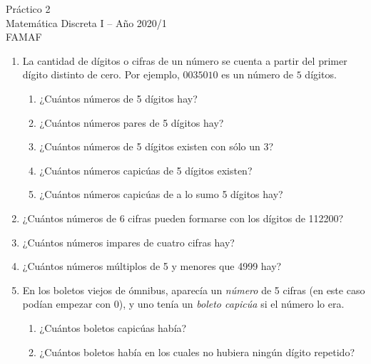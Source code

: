 \documentclass[12pt,spanish,makeidx]{amsbook}
\begin{document}
{\bf \begin{center} Práctico 2 \\ Matemática Discreta I -- Año 2020/1 \\ FAMAF \end{center}}

\smallskip

\begin {enumerate}


\item La cantidad de dígitos o cifras de un número se cuenta a partir del primer dígito distinto de cero. Por ejemplo, $0035010$ es un número de $5$ dígitos.
\begin{enumerate}
\item ¿Cuántos números de 5 dígitos hay?
\item ¿Cuántos números pares de 5 dígitos  hay?
\item ¿Cuántos números de 5 dígitos existen con sólo un 3?
\item ¿Cuántos números capicúas de 5 dígitos existen?
\item ¿Cuántos números capicúas de a lo sumo 5 dígitos hay?
\end{enumerate}

\smallskip

\item ¿Cuántos números de 6 cifras pueden formarse con los dígitos de 112200?

\smallskip

\item ¿Cuántos números impares de cuatro cifras hay?

\smallskip

\item ¿Cuántos números múltiplos de  5 y menores que 4999 hay?

\smallskip

\item En los boletos viejos de ómnibus, aparecía un {\em número} de 5 cifras (en este caso podían empezar con 0), y uno tenía un {\it boleto capicúa} si el número lo era.
\begin{enumerate}
\item ¿Cuántos boletos capicúas había?
\item ¿Cuántos boletos había en los cuales no hubiera ningún dígito repetido?
\end{enumerate}


\end{enumerate}
\end{document}
